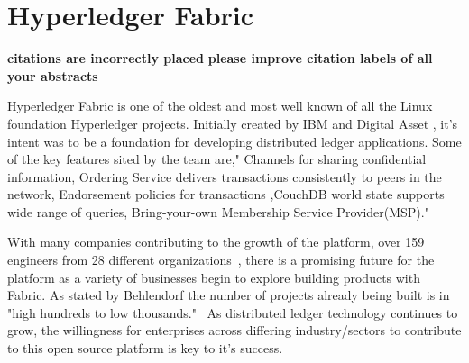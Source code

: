 \section{Hyperledger Fabric}

{\bf citations are incorrectly placed}
{\bf please improve citation labels of all your abstracts}

Hyperledger Fabric is one of the oldest and most well known of all the 
Linux foundation Hyperledger projects. Initially created by IBM and Digital 
Asset , it’s intent was to be a foundation for developing distributed ledger 
applications. Some of the key features sited by the team are," Channels for 
sharing confidential information, Ordering Service delivers transactions 
consistently to peers in the network, Endorsement policies for transactions
,CouchDB world state supports wide range of queries, Bring-your-own Membership 
Service Provider(MSP)."\cite{Hyperledger Fabric}

With many companies contributing to the growth of the platform, over 159 engineers
from 28 different organizations~\cite{Behlendorf Interview}, there is a promising
future for the platform as a variety of businesses begin to explore building products
with Fabric. As stated by Behlendorf the number of projects already being built is in
"high hundreds to low thousands."~\cite{Behlendorf Interview} As distributed ledger
technology continues to grow, the willingness for enterprises across differing
industry/sectors to contribute to this open source platform is key to it's 
success.

